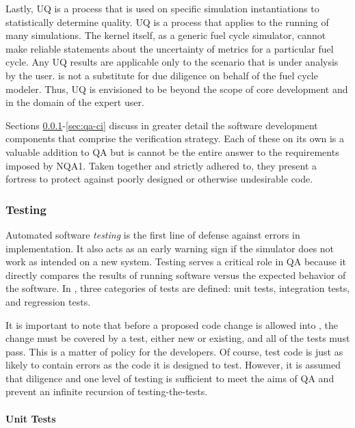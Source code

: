 Lastly, \gls{UQ} is a process that is used on specific simulation
instantiations to statistically determine quality. \gls{UQ} is a process that applies
to the running of many \Cyclus simulations. The kernel itself, as a generic fuel cycle
simulator, cannot make reliable statements about the uncertainty of metrics for a particular fuel
cycle. Any \gls{UQ} results are applicable only to the scenario that is under
analysis by the user. \Cyclus is not a substitute for due diligence on behalf of the fuel
cycle modeler. Thus, \gls{UQ} is envisioned to be beyond the scope of core development
and in the domain of the expert user.

Sections \ref{sec:qa-testing}-\ref{sec:qa-ci} discuss in greater detail the software
development components that comprise the \Cyclus verification strategy.
Each of these on its own is a valuable addition to \gls{QA} but is cannot be the
entire answer to the requirements imposed by \gls{NQA1}. Taken together and strictly
adhered to, they present a fortress to protect against poorly designed or otherwise undesirable code.


\subsubsection{Testing}
\label{sec:qa-testing}

Automated software \emph{testing} is the first line of defense against
errors in implementation. It also acts as an early warning sign if the
simulator does not work as intended on a new system.
Testing serves a critical role in \gls{QA} because it directly compares the
results of running software versus the expected behavior of the software.
In \Cyclus, three categories of tests are defined: unit tests, integration
tests, and regression tests.

It is important to note that before a proposed
code change is allowed into \Cyclus,  the change must be covered by a test, either new or existing, and all of the tests must pass.  This is a
matter of policy for the developers. Of course, test code is
just as likely to contain errors as the code it is designed to test.
However, it is assumed that diligence and one level of testing
is sufficient to meet the aims of \gls{QA} and prevent an infinite recursion
of testing-the-tests.

\paragraph{Unit Tests}


